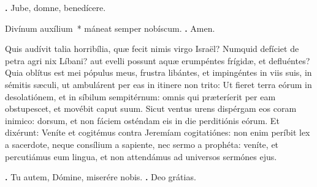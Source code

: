 \begin{small}
\textbf{\Vbar.} Jube, domne, benedícere.

Divínum auxílium~* máneat semper nobíscum. \textbf{\Rbar.} Amen.
\end{small}


Quis audívit talia horribília, quæ fecit nimis virgo Israël?
Numquid defíciet de petra agri nix Líbani? aut evelli possunt aquæ erumpéntes frígidæ, et defluéntes?
Quia oblítus est mei pópulus meus, frustra libántes, et impingéntes in viis suis, in sémitis sæculi, ut ambulárent per eas in itinere non trito:
Ut fieret terra eórum in desolatiónem, et in síbilum sempitérnum: omnis qui præteríerit per eam obstupescet, et movébit caput suum.
Sicut ventus urens dispérgam eos coram inimico: dorsum, et non fáciem osténdam eis in die perditiónis eórum.
Et dixérunt: Veníte et cogitémus contra Jeremíam cogitatiónes: non enim períbit lex a sacerdote, neque consílium a sapiente, nec sermo a prophéta: veníte, et percutiámus eum lingua, et non attendámus ad universos sermónes ejus.

\textbf{\Vbar.} Tu autem, Dómine, miserére nobis.
\textbf{\Rbar.} Deo grátias.

